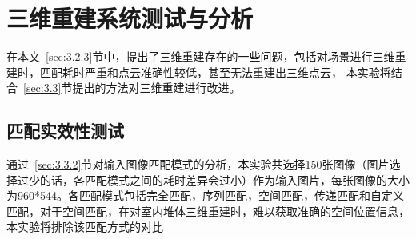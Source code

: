 \section{三维重建系统测试与分析}
\label{sec:5.3}
在本文~\ref{sec:3.2.3}节中，提出了三维重建存在的一些问题，包括对场景进行三维重建时，匹配耗时严重和点云准确性较低，甚至无法重建出三维点云，
本实验将结合~\ref{sec:3.3}节提出的方法对三维重建进行改进。
\subsection{匹配实效性测试}
通过~\ref{sec:3.3.2}节对输入图像匹配模式的分析，本实验共选择150张图像（图片选择过少的话，各匹配模式之间的耗时差异会过小）作为输入图片，每张图像的大小为960*544。各匹配模式包括完全匹配，序列匹配，空间匹配，传递匹配和自定义匹配，对于空间匹配，在对室内堆体三维重建时，难以获取准确的空间位置信息，本实验将排除该匹配方式的对比

